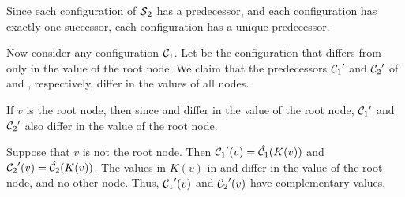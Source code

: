 Since each configuration of $\mbox{$\mathcal{S}$}_2$ has a predecessor, 
and each configuration has exactly one successor,
each configuration has a unique predecessor.

Now consider any configuration $\mbox{$\mathcal{C}_{1}$}$.
Let \calctwo{} be the configuration that differs from 
\calcone{} only in the value of the root node.
We claim that the predecessors $\calcone'$ and $\calctwo'$
of \calcone{} and \calctwo{}, respectively, 
differ in the values of all nodes.

If $v$ is the root node, then since \calcone{} and \calctwo{} 
differ in the value of the root node,
$\calcone'$ and $\calctwo'$ also differ in the value of the root node.

Suppose that $v$ is not the root node.
Then $\mbox{$\mathcal{C}_{1}$}'(v) = \hat{\mbox{$\mathcal{C}_{1}$}}(K(v))$ and $\mbox{$\mathcal{C}_{2}$}'(v) = \hat{\mbox{$\mathcal{C}_{2}$}}(K(v))$.
The values in $K(v)$ in \calcone{} and \calctwo{} differ 
in the value of the root node, and no other node.
Thus, $\mbox{$\mathcal{C}_{1}$}'(v)$ and $\mbox{$\mathcal{C}_{2}$}'(v)$ have complementary values. \QED


\iffalse
The underlying graph $G(V,E)$ is a simple path on $n$ nodes.
Choose any node of $G$, and call this node $x$ the {\em key node}. For
every other node $v$, choose any neighbor $w$ of $v$ that is closer to the
key node than $v$. Call this node $w$ the {\em key neighbor} of $v$.
The local transition function of the key node $x$ is the identity
function (i.e., the value of the local function $f_x$ at $x$ is
the current state of $x$).
For any other node $v$, the local transition function of
$v$ is the XOR (i.e., exclusive or) of the state of $v$ 
and that if its key neighbor.
This completes the construction of S.

Now consider any configuration \calcone. 
Let \calctwo{} be the configuration that differs 
from \calcone{} only in the value of the key node.

We claim that \calcone{} and \calctwo{} have predecessors that differ in the
values of all nodes. 
Let $\calcone'$ and $\calctwo'$ denote the predecessors of
\calcone{} and \calctwo.
We use induction on the distance of a given node from the key node.
First, since the transition function of the key node is the identity function,
$\calcone'$ and $\calctwo'$ differ on the key node.
Now, consider any nonkey node $v$.  Suppose its key neighbor is $u$.
From the induction hypotheses, $\calcone'$ and $\calctwo'$ differ on $u$.
Since \calcone{} and \calctwo{} have the same value of $v$, 
but their predecessors have different values of $u$, 
$\calcone'$ and $\calctwo'$ have different values of $v$. \QED
\fi


